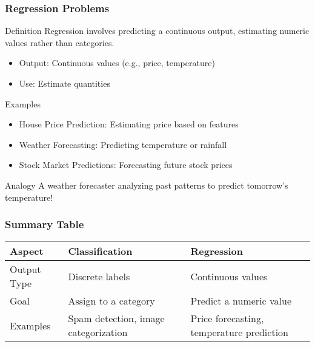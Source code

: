\documentclass[aspectratio=169]{beamer}
\begin{document}
\begin{frame}[fragile]
    \frametitle{Regression Problems}
    \begin{block}{Definition}
        Regression involves predicting a continuous output, estimating numeric values rather than categories.
    \end{block}
    \begin{itemize}
        \item Output: Continuous values (e.g., price, temperature)
        \item Use: Estimate quantities
    \end{itemize}
    \begin{block}{Examples}
        \begin{itemize}
            \item House Price Prediction: Estimating price based on features
            \item Weather Forecasting: Predicting temperature or rainfall
            \item Stock Market Predictions: Forecasting future stock prices
        \end{itemize}
    \end{block}
    \begin{block}{Analogy}
        A weather forecaster analyzing past patterns to predict tomorrow's temperature!
    \end{block}
\end{frame}

\begin{frame}[fragile]
    \frametitle{Summary Table}
    \begin{table}[ht]
        \centering
        \begin{tabular}{|l|l|l|}
            \hline
            Aspect          & Classification                               & Regression                 \\ \hline
            Output Type     & Discrete labels                             & Continuous values          \\ \hline
            Goal             & Assign to a category                      & Predict a numeric value    \\ \hline
            Examples         & Spam detection, image categorization      & Price forecasting, temperature prediction \\ \hline
        \end{tabular}
    \end{table}
\end{frame}
\end{document}

